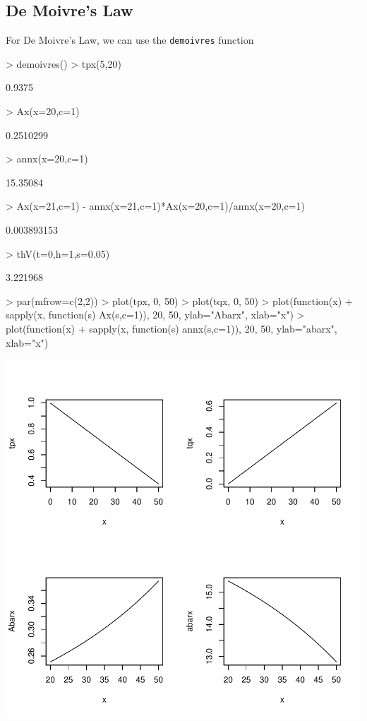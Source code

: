 \documentclass[12pt]{article}
\begin{document}
\subsection{De Moivre's Law}
For De Moivre's Law, we can use the \texttt{demoivres} function
\begin{Schunk}
\begin{Sinput}
> demoivres()
> tpx(5,20)
\end{Sinput}
\begin{Soutput}
[1] 0.9375
\end{Soutput}
\begin{Sinput}
> Ax(x=20,c=1)
\end{Sinput}
\begin{Soutput}
[1] 0.2510299
\end{Soutput}
\begin{Sinput}
> annx(x=20,c=1)
\end{Sinput}
\begin{Soutput}
[1] 15.35084
\end{Soutput}
\begin{Sinput}
> Ax(x=21,c=1) - annx(x=21,c=1)*Ax(x=20,c=1)/annx(x=20,c=1)
\end{Sinput}
\begin{Soutput}
[1] 0.003893153
\end{Soutput}
\begin{Sinput}
> thV(t=0,h=1,s=0.05)
\end{Sinput}
\begin{Soutput}
[1] 3.221968
\end{Soutput}
\begin{Sinput}
> par(mfrow=c(2,2))
> plot(tpx, 0, 50)
> plot(tqx, 0, 50)
> plot(function(x) 
+   sapply(x, function(s) Ax(s,c=1)), 20, 50, ylab="Abarx", xlab="x")
> plot(function(x) 
+ sapply(x, function(s) annx(s,c=1)), 20, 50, ylab="abarx", xlab="x")
\end{Sinput}
\end{Schunk}
\includegraphics{survivalModels-002}
\end{document}
